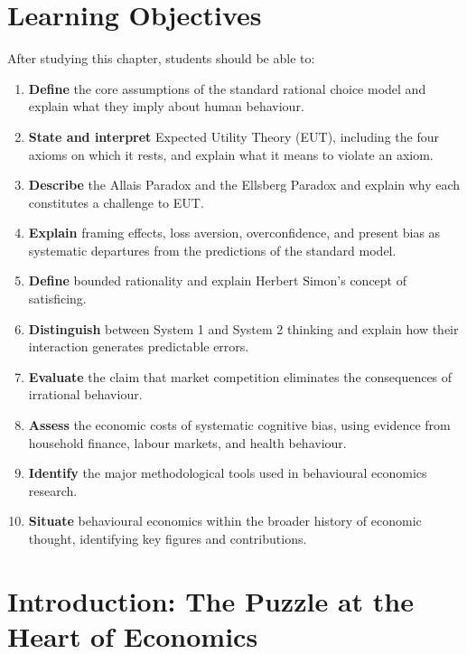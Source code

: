\documentclass[12pt, letterpaper]{article}
\begin{document}
\medskip


\section*{Learning Objectives}


After studying this chapter, students should be able to:

\begin{enumerate}
\item \textbf{Define} the core assumptions of the standard rational choice model and explain what they imply about human behaviour.
\item \textbf{State and interpret} Expected Utility Theory (EUT), including the four axioms on which it rests, and explain what it means to violate an axiom.
\item \textbf{Describe} the Allais Paradox and the Ellsberg Paradox and explain why each constitutes a challenge to EUT.
\item \textbf{Explain} framing effects, loss aversion, overconfidence, and present bias as systematic departures from the predictions of the standard model.
\item \textbf{Define} bounded rationality and explain Herbert Simon's concept of satisficing.
\item \textbf{Distinguish} between System 1 and System 2 thinking and explain how their interaction generates predictable errors.
\item \textbf{Evaluate} the claim that market competition eliminates the consequences of irrational behaviour.
\item \textbf{Assess} the economic costs of systematic cognitive bias, using evidence from household finance, labour markets, and health behaviour.
\item \textbf{Identify} the major methodological tools used in behavioural economics research.
\item \textbf{Situate} behavioural economics within the broader history of economic thought, identifying key figures and contributions.
\end{enumerate}

\medskip


\section*{Introduction: The Puzzle at the Heart of Economics}
\end{document}
